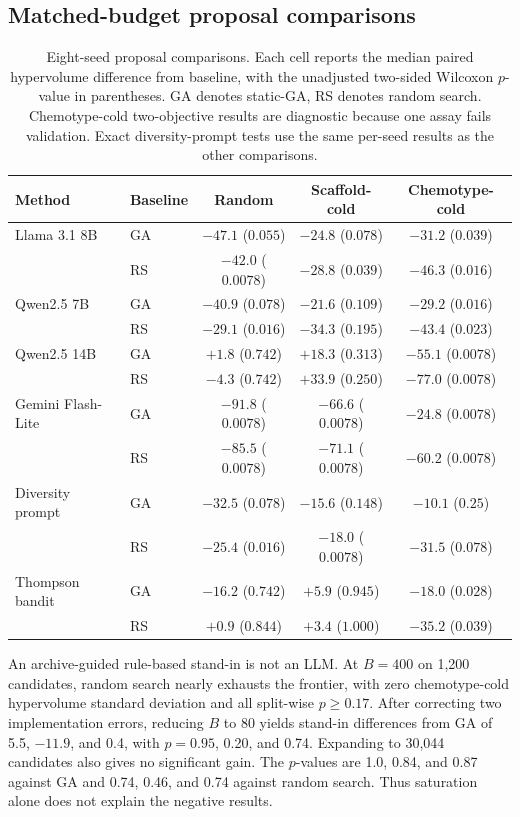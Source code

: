 \documentclass[11pt]{article}
\begin{document}
\subsection{Matched-budget proposal comparisons}
\label{sec:comparisons}
\begin{table}[!htbp]
\caption{Eight-seed proposal comparisons. Each cell reports the median paired hypervolume difference from baseline, with the unadjusted two-sided Wilcoxon $p$-value in parentheses. GA denotes static-GA, RS denotes random search. Chemotype-cold two-objective results are diagnostic because one assay fails validation. Exact diversity-prompt tests use the same per-seed results as the other comparisons.}
\label{tab:summary}
\centering
\begin{tabular}{@{}llccc@{}}
\toprule
Method & Baseline & Random & Scaffold-cold & Chemotype-cold \\
\midrule
Llama 3.1 8B & GA & $-47.1$ ($0.055$) & $-24.8$ ($0.078$) & $-31.2$ ($0.039$) \\
 & RS & $-42.0$ ($0.0078$) & $-28.8$ ($0.039$) & $-46.3$ ($0.016$) \\
Qwen2.5 7B & GA & $-40.9$ ($0.078$) & $-21.6$ ($0.109$) & $-29.2$ ($0.016$) \\
 & RS & $-29.1$ ($0.016$) & $-34.3$ ($0.195$) & $-43.4$ ($0.023$) \\
Qwen2.5 14B & GA & $+1.8$ ($0.742$) & $+18.3$ ($0.313$) & $-55.1$ ($0.0078$) \\
 & RS & $-4.3$ ($0.742$) & $+33.9$ ($0.250$) & $-77.0$ ($0.0078$) \\
Gemini Flash-Lite & GA & $-91.8$ ($0.0078$) & $-66.6$ ($0.0078$) & $-24.8$ ($0.0078$) \\
 & RS & $-85.5$ ($0.0078$) & $-71.1$ ($0.0078$) & $-60.2$ ($0.0078$) \\
Diversity prompt & GA & $-32.5$ ($0.078$) & $-15.6$ ($0.148$) & $-10.1$ ($0.25$) \\
 & RS & $-25.4$ ($0.016$) & $-18.0$ ($0.0078$) & $-31.5$ ($0.078$) \\
Thompson bandit & GA & $-16.2$ ($0.742$) & $+5.9$ ($0.945$) & $-18.0$ ($0.028$) \\
 & RS & $+0.9$ ($0.844$) & $+3.4$ ($1.000$) & $-35.2$ ($0.039$) \\
\bottomrule
\end{tabular}
\end{table}

An archive-guided rule-based stand-in is not an LLM. At $B=400$ on 1,200 candidates, random search nearly exhausts the frontier, with zero chemotype-cold hypervolume standard deviation and all split-wise $p\ge0.17$. After correcting two implementation errors, reducing $B$ to 80 yields stand-in differences from GA of 5.5, $-11.9$, and 0.4, with $p=0.95$, 0.20, and 0.74. Expanding to 30,044 candidates also gives no significant gain. The $p$-values are 1.0, 0.84, and 0.87 against GA and 0.74, 0.46, and 0.74 against random search. Thus saturation alone does not explain the negative results.
\end{document}
